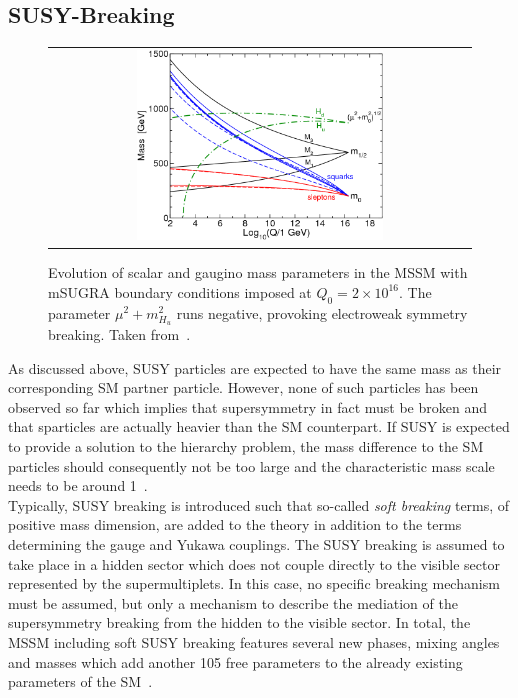 \subsection{SUSY-Breaking}
\label{subsec:susy_breaking}
\begin{figure}[!t]
  \centering 
  \begin{tabular}{c}
    \includegraphics[width=0.6\textwidth]{figures/MSSMrun.png}
  \end{tabular}
  \caption{Evolution of scalar and gaugino mass parameters in the MSSM with mSUGRA boundary conditions imposed at $Q_0 = 2 \times 10^{16}$\gev. The parameter $\mu^2 + m^2_{H_{u}}$ runs negative, provoking electroweak symmetry breaking. Taken from~\cite{Martin:1997ns}.}
  \label{fig:MSSMrun}
\end{figure}
As discussed above, SUSY particles are expected to have the same mass as their corresponding SM partner particle. However, none of such particles has been observed so far which implies that supersymmetry in fact must be broken and that sparticles are actually heavier than the SM counterpart. If SUSY is expected to provide a solution to the hierarchy problem, the mass difference to the SM particles should consequently not be too large and the characteristic mass scale needs to be around 1\tev~\cite{Martin:1997ns}. \\
Typically, SUSY breaking is introduced such that so-called \textit{soft breaking} terms, \ie of positive mass dimension, are added to the theory in addition to the terms determining the gauge and Yukawa couplings. The SUSY breaking is assumed to take place in a hidden sector which does not couple directly to the visible sector represented by the supermultiplets. In this case, no specific breaking mechanism must be assumed, but only a mechanism to describe the mediation of the supersymmetry breaking from the hidden to the visible sector. In total, the MSSM including soft SUSY breaking features several new phases, mixing angles and masses which add another 105 free parameters to the already existing parameters of the SM~\cite{Dimopoulos:1995ju}.  \\
